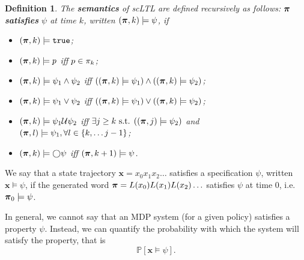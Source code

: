 \documentclass[conference]{IEEEtran}
\newtheorem{definition}{Definition}
\newcommand{\sofieNew}[1]{{\color{blue}#1}}
\begin{document}
\begin{definition}
 The \textbf{semantics} of scLTL are defined recursively as follows: $\boldsymbol{\pi}$ \textbf{satisfies} $\psi$ at time $k$, written $(\boldsymbol{\pi}, k) \models \psi$, if
 \begin{itemize}
    \item $(\boldsymbol{\pi}, k) \models \texttt{true}$;
    \item $(\boldsymbol{\pi}, k) \models p$ iff $p \in \pi_k$;
    \item $(\boldsymbol{\pi}, k) \models \psi_1 \land  \psi_2  $ iff $ ( (\boldsymbol{\pi}, k) \models \psi_1 ) \land ( (\boldsymbol{\pi}, k) \models \psi_2 ) $;
    \item $(\boldsymbol{\pi}, k) \models \psi_1 \lor  \psi_2  $ iff $ ( (\boldsymbol{\pi}, k) \models \psi_1 ) \lor ( (\boldsymbol{\pi}, k) \models \psi_2 ) $;
    \item $(\boldsymbol{\pi}, k) \models  \psi_1 \mathcal{U} \psi_2 $ iff $\exists j \geq k \text{ s.t. } ((\boldsymbol{\pi}, j) \models \psi_2 ) $ and $(\boldsymbol{\pi}, l) \models \psi_1, \forall l \in \{k, \ldots j-1\}$;
    \item $(\boldsymbol{\pi}, k) \models \bigcirc \psi$ iff $(\boldsymbol{\pi}, k+1) \models \psi$.
 \end{itemize}

\end{definition}

We say that a state trajectory $\mathbf{x} = x_0 x_1 x_2 \ldots$ satisfies a specification $\psi$, written $\mathbf{x} \models \psi$, if the generated word $\boldsymbol{\pi} =L(x_0) L(x_1) L(x_2) \ldots$ satisfies $\psi$ at time 0, i.e. $\boldsymbol{\pi}_0 \models \psi$.

\sofieNew{In general, we cannot say that an MDP system (for a given policy) satisfies a property $\psi$. Instead, we can quantify the probability with which the system will satisfy the property, that is  \[\mathbb P[\mathbf x \vDash \psi ] .\]
}


\end{document}
